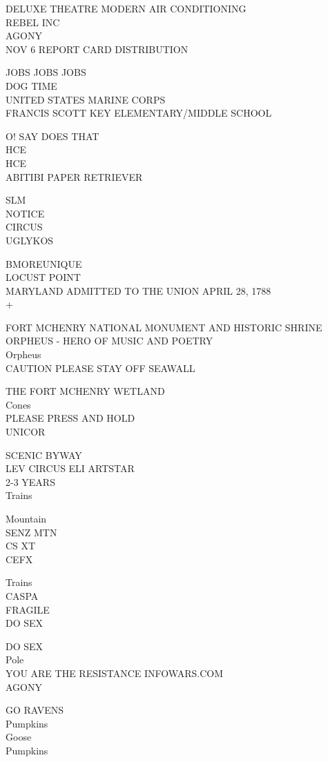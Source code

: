 \documentclass[10pt,letterpaper]{article}
\begin{document}
DELUXE THEATRE MODERN AIR CONDITIONING\\
REBEL INC\\
AGONY\\
NOV 6 REPORT CARD DISTRIBUTION

JOBS JOBS JOBS\\
DOG TIME\\
UNITED STATES MARINE CORPS\\
FRANCIS SCOTT KEY ELEMENTARY/MIDDLE SCHOOL

O! SAY DOES THAT\\
HCE\\
HCE\\
ABITIBI PAPER RETRIEVER

SLM\\
NOTICE\\
CIRCUS\\
UGLYKOS

BMOREUNIQUE\\
LOCUST POINT\\
MARYLAND ADMITTED TO THE UNION APRIL 28, 1788\\
+

FORT MCHENRY NATIONAL MONUMENT AND HISTORIC SHRINE\\
ORPHEUS {-} HERO OF MUSIC AND POETRY\\
Orpheus\\
CAUTION PLEASE STAY OFF SEAWALL

THE FORT MCHENRY WETLAND\\
Cones\\
PLEASE PRESS AND HOLD\\
UNICOR

SCENIC BYWAY\\
LEV CIRCUS ELI ARTSTAR\\
2{-}3 YEARS\\
Trains

Mountain\\
SENZ MTN\\
CS XT\\
CEFX

Trains\\
CASPA\\
FRAGILE\\
DO SEX

DO SEX\\
Pole\\
YOU ARE THE RESISTANCE INFOWARS.COM\\
AGONY

GO RAVENS\\
Pumpkins\\
Goose\\
Pumpkins
\end{document}
